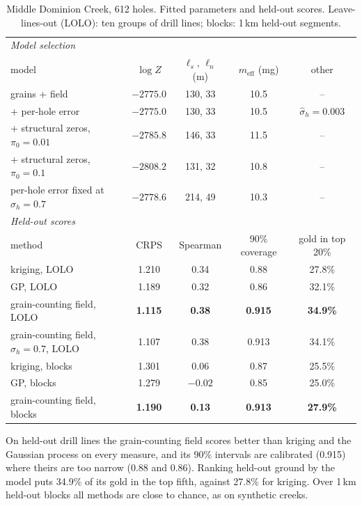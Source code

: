 \documentclass[11pt,a4paper]{article}
\theoremstyle{remark}
\newcommand{\meff}{m_{\mathrm{eff}}}
\begin{document}
\begin{table}[t]
\centering
\small
\caption{Middle Dominion Creek, 612 holes. Fitted parameters and held-out scores. Leave-lines-out (LOLO): ten groups of drill lines; blocks: 1\,km held-out segments.}
\label{tab:dominion}
\begin{tabular}{lcccc}
\toprule
\multicolumn{5}{l}{\emph{Model selection}} \\
model & $\log Z$ & $\ell_s$, $\ell_n$ (m) & $\meff$ (mg) & other \\
\midrule
grains + field & $-2775.0$ & 130, 33 & 10.5 & -- \\
+ per-hole error & $-2775.0$ & 130, 33 & 10.5 & $\hat\sigma_h = 0.003$ \\
+ structural zeros, $\pi_0 = 0.01$ & $-2785.8$ & 146, 33 & 11.5 & -- \\
+ structural zeros, $\pi_0 = 0.1$ & $-2808.2$ & 131, 32 & 10.8 & -- \\
per-hole error fixed at $\sigma_h = 0.7$ & $-2778.6$ & 214, 49 & 10.3 & -- \\
\midrule
\multicolumn{5}{l}{\emph{Held-out scores}} \\
method & CRPS & Spearman & 90\% coverage & gold in top 20\% \\
\midrule
kriging, LOLO & 1.210 & 0.34 & 0.88 & 27.8\% \\
GP, LOLO & 1.189 & 0.32 & 0.86 & 32.1\% \\
grain-counting field, LOLO & \textbf{1.115} & \textbf{0.38} & \textbf{0.915} & \textbf{34.9\%} \\
grain-counting field, $\sigma_h = 0.7$, LOLO & 1.107 & 0.38 & 0.913 & 34.1\% \\
kriging, blocks & 1.301 & 0.06 & 0.87 & 25.5\% \\
GP, blocks & 1.279 & $-0.02$ & 0.85 & 25.0\% \\
grain-counting field, blocks & \textbf{1.190} & \textbf{0.13} & \textbf{0.913} & \textbf{27.9\%} \\
\bottomrule
\end{tabular}
\end{table}

On held-out drill lines the grain-counting field scores better than kriging and the Gaussian process on every measure, and its 90\% intervals are calibrated (0.915) where theirs are too narrow (0.88 and 0.86). Ranking held-out ground by the model puts 34.9\% of its gold in the top fifth, against 27.8\% for kriging. Over 1\,km held-out blocks all methods are close to chance, as on synthetic creeks.
\end{document}
